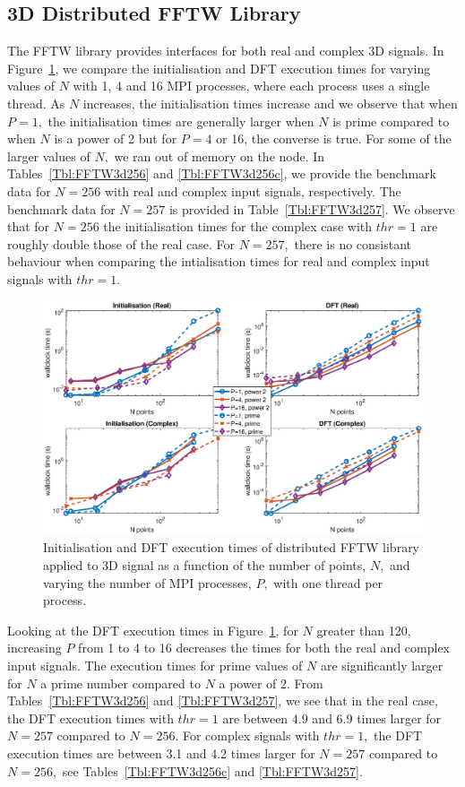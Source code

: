 \documentclass[a4paper]{article}
\begin{document}
\subsection{3D Distributed FFTW Library}\label{Sec:3DDistFFTW}
The FFTW library provides interfaces for both real and complex 3D
signals. In Figure~\ref{3DDistFFTW}, we compare the initialisation and
DFT execution times for varying values of $N$ with 1, 4 and 16 MPI
processes, where each process uses a single thread. As $N$ increases,
the initialisation times increase and we observe that when $P=1,$ the
initialisation times are generally larger when $N$ is prime compared
to when $N$ is a power of 2 but for $P=4$ or 16, the converse is
true. For some of the larger values of $N,$ we ran out of memory on
the node. In Tables~\ref{Tbl:FFTW3d256} and \ref{Tbl:FFTW3d256c}, we
provide the benchmark data for $N=256$ with real and complex input
signals, respectively. The benchmark data for $N=257$ is provided in
Table~\ref{Tbl:FFTW3d257}. We observe that for $N=256$ the
initialisation times for the complex case with $thr=1$ are roughly
double those of the real case. For $N=257,$ there is no consistant
behaviour when comparing the intialisation times for real and complex
input signals with $thr=1.$



\begin{figure}[htb]
    \centering
    \includegraphics[width=0.9\linewidth]{../results/fftw_3d_mpi.eps}
  \caption{Initialisation and DFT execution times of distributed FFTW library applied to 3D signal as a function of the
    number of points, $N,$ and varying the number of MPI processes, $P,$ with one thread per process.}
  \label{3DDistFFTW}
\end{figure}

Looking at the DFT execution times in Figure~\ref{3DDistFFTW}, for $N$
greater than 120, increasing $P$ from 1 to 4 to 16 decreases the times
for both the real and complex input signals. The execution times for
prime values of $N$ are significantly larger for $N$ a prime number
compared to $N$ a power of 2. From Tables~\ref{Tbl:FFTW3d256} and
\ref{Tbl:FFTW3d257}, we see that in the real case, the DFT execution
times with $thr=1$ are between 4.9 and 6.9 times larger for $N=257$
compared to $N=256.$ For complex signals with $thr=1,$ the DFT
execution times are between 3.1 and 4.2 times larger for $N=257$
compared to $N=256,$ see Tables~\ref{Tbl:FFTW3d256c} and
\ref{Tbl:FFTW3d257}.
\end{document}
